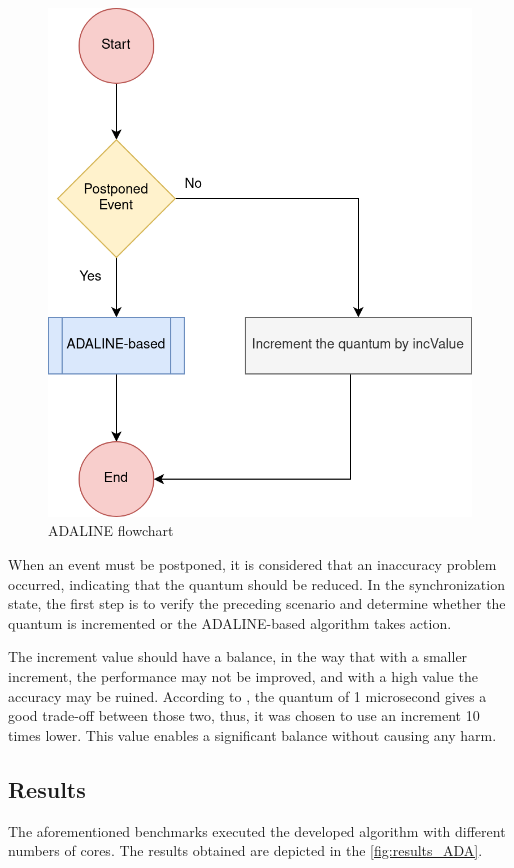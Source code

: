 \begin{figure}[H]
 	\includegraphics[width=0.32\linewidth]{Images/ADALINE_v1.png}
 	\caption{ADALINE flowchart}
	 \label{fig_ADALINE_v1}
\end{figure}

When an event must be postponed, it is considered that an inaccuracy problem occurred, indicating that the quantum should be reduced. In 
the synchronization state, the first step is to verify the preceding scenario and determine whether the quantum is incremented or the 
ADALINE-based algorithm takes action.

The increment value should have a balance, in the way that with a smaller increment, the performance may not be improved, and 
with a high value the accuracy may be ruined. According to \cite{pargem5}, the quantum of 1 microsecond gives a good trade-off between those 
two, thus, it was chosen to use an increment 10 times lower. This value enables a significant balance without causing any harm.

\subsection{Results}
\label{sec:ADALINE_results}

The aforementioned benchmarks executed the developed algorithm with different numbers of cores. The results obtained are depicted in the 
\autoref{fig:results_ADA}. 

